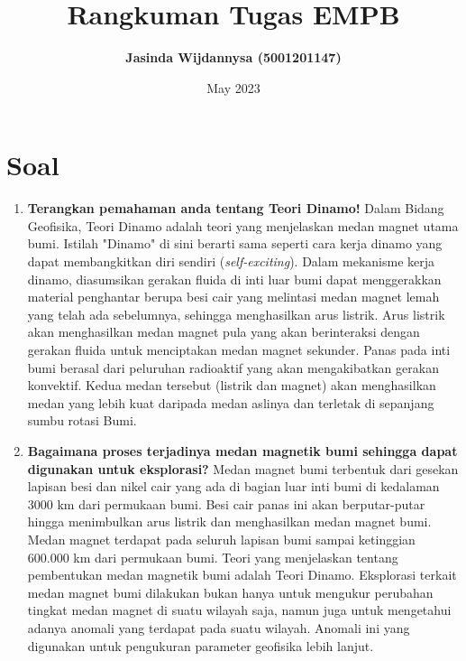 \documentclass{article}
\title{\textbf{Rangkuman Tugas EMPB}}
\author{\textbf{Jasinda Wijdannysa (5001201147)}}
\affil{Departemen Fisika, Institut Teknologi Sepuluh Nopember}
\date{May 2023}
\begin{document}
\maketitle

\section*{Soal}
\begin{enumerate}
    \item \textbf{Terangkan pemahaman anda tentang Teori Dinamo!}
    \subitem Dalam Bidang Geofisika, Teori Dinamo adalah teori yang menjelaskan medan magnet utama bumi. Istilah "Dinamo" di sini berarti sama seperti cara kerja dinamo yang dapat membangkitkan diri sendiri (\textit{self-exciting}). Dalam mekanisme kerja dinamo, diasumsikan gerakan fluida di inti luar bumi dapat menggerakkan material penghantar berupa besi cair yang melintasi medan magnet lemah yang telah ada sebelumnya, sehingga menghasilkan arus listrik. Arus listrik akan menghasilkan medan magnet pula yang akan berinteraksi dengan gerakan fluida untuk menciptakan medan magnet sekunder. Panas pada inti bumi berasal dari peluruhan radioaktif yang akan mengakibatkan gerakan konvektif. Kedua medan tersebut (listrik dan magnet) akan menghasilkan medan yang lebih kuat daripada medan aslinya dan terletak di sepanjang sumbu rotasi Bumi.
    \item \textbf{Bagaimana proses terjadinya medan magnetik bumi sehingga dapat digunakan untuk eksplorasi?}
    \subitem Medan magnet bumi terbentuk dari gesekan lapisan besi dan nikel cair yang ada di bagian luar inti bumi di kedalaman 3000 km dari permukaan bumi. Besi cair panas ini akan berputar-putar hingga menimbulkan arus listrik dan menghasilkan medan magnet bumi. Medan magnet terdapat pada seluruh lapisan bumi sampai ketinggian 600.000 km dari permukaan bumi. Teori yang menjelaskan tentang pembentukan medan magnetik bumi adalah Teori Dinamo. Eksplorasi terkait medan magnet bumi dilakukan bukan hanya untuk mengukur perubahan tingkat medan magnet di suatu wilayah saja, namun juga untuk mengetahui adanya anomali yang terdapat pada suatu wilayah. Anomali ini yang digunakan untuk pengukuran parameter geofisika lebih lanjut.
    

\end{enumerate}
\end{document}
